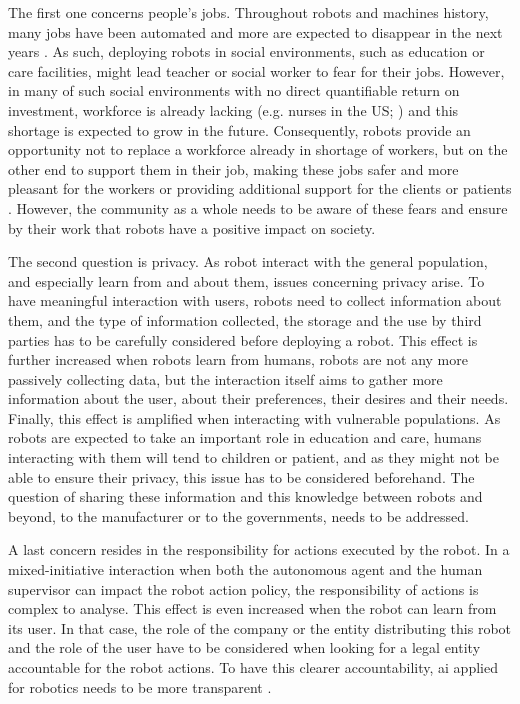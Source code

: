 The first one concerns people's jobs. Throughout robots and machines history, many jobs have been automated and more are expected to disappear in the next years \citep{frey2017future}. As such, deploying robots in social environments, such as education or care facilities, might lead teacher or social worker to fear for their jobs. However, in many of such social environments with no direct quantifiable return on investment, workforce is already lacking (e.g. nurses in the US; \citealt{nevidjon2001nursing}) and this shortage is expected to grow in the future. Consequently, robots provide an opportunity not to replace a workforce already in shortage of workers, but on the other end to support them in their job, making these jobs safer and more pleasant for the workers or providing additional support for the clients or patients \citep{belpaeme2012multimodal}. However, the community as a whole needs to be aware of these fears and ensure by their work that robots have a positive impact on society.

The second question is privacy. As robot interact with the general population, and especially learn from and about them, issues concerning privacy arise. To have meaningful interaction with users, robots need to collect information about them, and the type of information collected, the storage and the use by third parties has to be carefully considered before deploying a robot. This effect is further increased when robots learn from humans, robots are not any more passively collecting data, but the interaction itself aims to gather more information about the user, about their preferences, their desires and their needs. Finally, this effect is amplified when interacting with vulnerable populations. As robots are expected to take an important role in education and care, humans interacting with them will tend to children or patient, and as they might not be able to ensure their privacy, this issue has to be considered beforehand. The question of sharing these information and this knowledge between robots and beyond, to the manufacturer or to the governments, needs to be addressed.

A last concern resides in the responsibility for actions executed by the robot. In a mixed-initiative interaction when both the autonomous agent and the human supervisor can impact the robot action policy, the responsibility of actions is complex to analyse. This effect is even increased when the robot can learn from its user. In that case, the role of the company or the entity distributing this robot and the role of the user have to be considered when looking for a legal entity accountable for the robot actions. To have this clearer accountability, \gls{ai} applied for robotics needs to be more transparent \citep{wachter2017transparent}.

